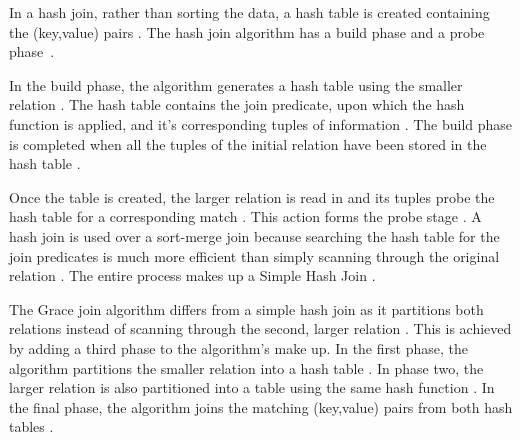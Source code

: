 \documentclass[10pt,twocolumn]{witseiepaper}
\begin{document}
In a hash join, rather than sorting the data, a hash table is created containing the (key,value) pairs \cite{thomas_zurek_optimisation_1997}. The hash join algorithm has a build phase and a probe phase~\cite{equijoin}. 

In the build phase, the algorithm generates a hash table using the smaller relation \cite{evaluating4JoinAlgorithms}. The hash table contains the join predicate, upon which the hash function is applied, and it's corresponding tuples of information \cite{thomas_zurek_optimisation_1997, evaluating4JoinAlgorithms}. The build phase is completed when all the tuples of the initial relation have been stored in the hash table \cite{thomas_zurek_optimisation_1997}. 

Once the table is created, the larger relation is read in and its tuples probe the hash table for a corresponding match \cite{thomas_zurek_optimisation_1997}. This action forms the probe stage \cite{evaluating4JoinAlgorithms}. A hash join is used over a sort-merge join because searching the hash table for the join predicates is much more efficient than simply scanning through the original relation \cite{evaluating4JoinAlgorithms}. The entire process makes up a Simple Hash Join \cite{evaluating4JoinAlgorithms}. 

The Grace join algorithm differs from a simple hash join as it partitions both relations instead of scanning through the second, larger relation \cite{graceHash}. This is achieved by adding a third phase to the algorithm's make up. In the first phase, the algorithm partitions the smaller relation into a hash table \cite{graceHash}. In phase two, the larger relation is also partitioned into a table using the same hash function \cite{evaluating4JoinAlgorithms}. In the final phase, the algorithm joins the matching (key,value) pairs from both hash tables \cite{evaluating4JoinAlgorithms}.
\end{document}
